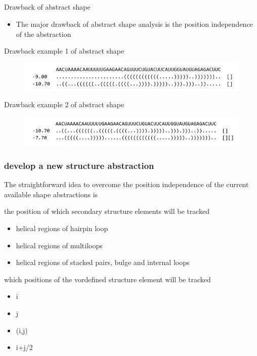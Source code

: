 \documentclass[ignorenonframetext,10pt]{beamer}
\begin{document}
\subsection{}
\begin{frame}
\frametitle{}
   \begin{block}{\small Drawback of abstract shape}
   \begin{itemize} 
   \item The major drawback of abstract shape analysis is the position
   independence of the abstraction
   \end{itemize}
   \end{block}
   \begin{block}{\small Drawback example 1 of abstract shape}
   \begin{figure}
     \includegraphics[scale=0.55]{images/drawback_1.jpg} 
   \end{figure}
   \end{block}
   \begin{block}{\small Drawback example 2 of abstract shape}
   \begin{figure}
     \includegraphics[scale=0.55]{images/drawback_2.jpg} 
   \end{figure}
   \end{block}
\end{frame}


\begin{frame}
\frametitle{develop a new structure abstraction}
    The straightforward idea to overcome the position independence of the
    current available shape abstractions is
    \begin{block}{the position of which secondary structure elements will be
    tracked}
    \begin{itemize} 
    \item helical regions of hairpin loop
    \item helical regions of multiloops %
    \item helical regions of stacked pairs, bulge and internal loops %
    \end{itemize}
    \end{block}
    \begin{block}{which positions of the vordefined structure element will be tracked}
    \begin{itemize} 
    \item i
    \item j   
    \item (i,j)
    \item i+j/2
    \end{itemize}    
    \end{block}
\end{frame}
\end{document}
